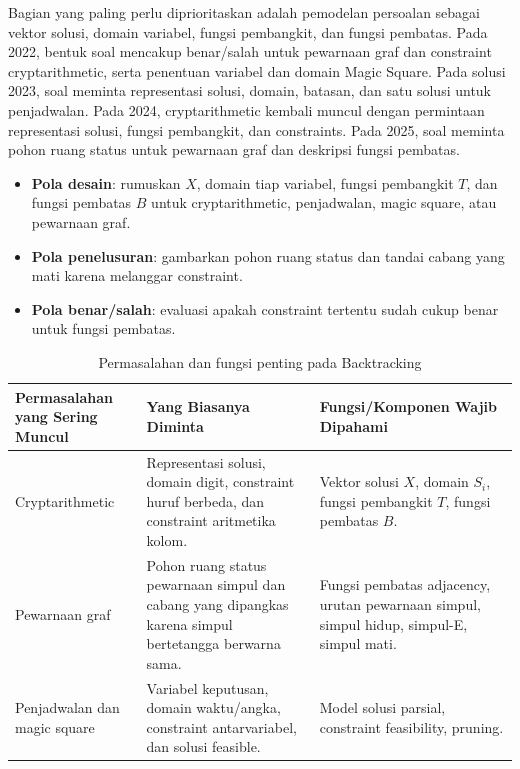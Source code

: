 Bagian yang paling perlu diprioritaskan adalah pemodelan persoalan sebagai vektor solusi, domain variabel, fungsi pembangkit, dan fungsi pembatas. Pada 2022, bentuk soal mencakup benar/salah untuk pewarnaan graf dan constraint cryptarithmetic, serta penentuan variabel dan domain Magic Square. Pada solusi 2023, soal meminta representasi solusi, domain, batasan, dan satu solusi untuk penjadwalan. Pada 2024, cryptarithmetic kembali muncul dengan permintaan representasi solusi, fungsi pembangkit, dan constraints. Pada 2025, soal meminta pohon ruang status untuk pewarnaan graf dan deskripsi fungsi pembatas.

\begin{itemize}
    \item \textbf{Pola desain}: rumuskan $X$, domain tiap variabel, fungsi pembangkit $T$, dan fungsi pembatas $B$ untuk cryptarithmetic, penjadwalan, magic square, atau pewarnaan graf.
    \item \textbf{Pola penelusuran}: gambarkan pohon ruang status dan tandai cabang yang mati karena melanggar constraint.
    \item \textbf{Pola benar/salah}: evaluasi apakah constraint tertentu sudah cukup benar untuk fungsi pembatas.
\end{itemize}

\begin{table}[H]
\centering
\begin{tabularx}{\textwidth}{|L{0.30\textwidth}|X|L{0.28\textwidth}|}
\hline
\textbf{Permasalahan yang Sering Muncul} & \textbf{Yang Biasanya Diminta} & \textbf{Fungsi/Komponen Wajib Dipahami} \\
\hline
Cryptarithmetic & Representasi solusi, domain digit, constraint huruf berbeda, dan constraint aritmetika kolom. & Vektor solusi $X$, domain $S_i$, fungsi pembangkit $T$, fungsi pembatas $B$. \\
\hline
Pewarnaan graf & Pohon ruang status pewarnaan simpul dan cabang yang dipangkas karena simpul bertetangga berwarna sama. & Fungsi pembatas adjacency, urutan pewarnaan simpul, simpul hidup, simpul-E, simpul mati. \\
\hline
Penjadwalan dan magic square & Variabel keputusan, domain waktu/angka, constraint antarvariabel, dan solusi feasible. & Model solusi parsial, constraint feasibility, pruning. \\
\hline
\end{tabularx}
\caption{Permasalahan dan fungsi penting pada Backtracking}
\label{tab:pola-fungsi-backtracking}
\end{table}

